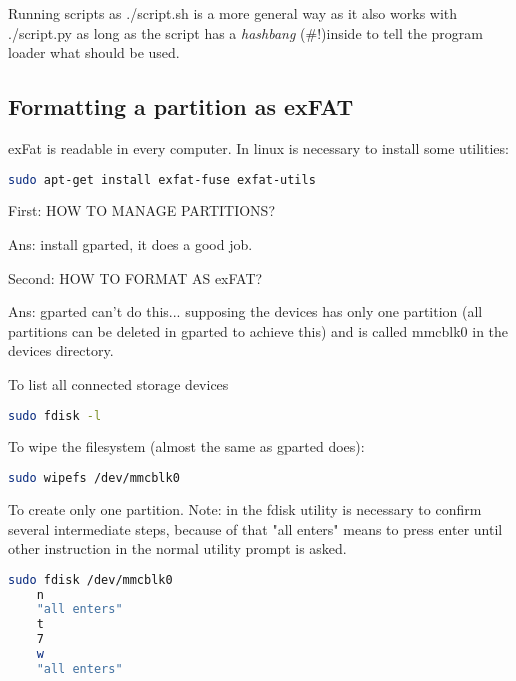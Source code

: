 \par Running scripts as ./script.sh is a more general way as it also works with ./script.py as long as the script has a \textit{hashbang} (\#!)inside to tell the program loader what should be used.





\subsection{Formatting a partition as exFAT}

\par exFat is readable in every computer. In linux is necessary to install some utilities:
\begin{lstlisting}[language=bash]
    sudo apt-get install exfat-fuse exfat-utils
\end{lstlisting}

\par First: HOW TO MANAGE PARTITIONS?
\par Ans: install gparted, it does a good job.

\vspace{1cm}
\par Second: HOW TO FORMAT AS exFAT?
\par Ans: gparted can't do this... supposing the devices has only one partition (all partitions can be deleted in gparted to achieve this) and is called mmcblk0 in the devices directory.

\par To list all connected storage devices
\begin{lstlisting}[language=bash]
    sudo fdisk -l
\end{lstlisting}

\par To wipe the filesystem (almost the same as gparted does):
\begin{lstlisting}[language=bash]
    sudo wipefs /dev/mmcblk0
\end{lstlisting}

\par To create only one partition. Note: in the fdisk utility is necessary to confirm several intermediate steps, because of that "all enters" means to press enter until other instruction in the normal utility prompt is asked.
\begin{lstlisting}[language=bash]
    sudo fdisk /dev/mmcblk0
    n
    "all enters"
    t
    7
    w
    "all enters"
\end{lstlisting}

